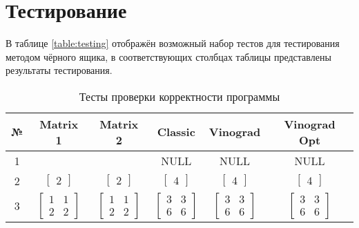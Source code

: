     \section{Тестирование}

        В таблице \ref{table:testing} отображён возможный набор тестов
        для тестирования методом чёрного ящика, в соответствующих столбцах таблицы представлены результаты тестирования.
        \begin{table}[h!]
            \caption{Тесты проверки корректности программы}
            \centering
            \begin{tabular}{|c|c|c|c|c|c|}
            \hline
            № & Matrix 1 & Matrix 2& Classic & Vinograd & Vinograd Opt \\\hline
            1 & \text{ } & \text{ } & NULL & NULL & NULL \\ \hline
            2 & $\begin{bmatrix} 2 \end{bmatrix}$ & $\begin{bmatrix} 2 \end{bmatrix}$ & $\begin{bmatrix} 4 \end{bmatrix}$ & $\begin{bmatrix} 4 \end{bmatrix}$ & $\begin{bmatrix} 4 \end{bmatrix}$\\ \hline
            3 & $\begin{bmatrix} 1 & 1 \\ 2 & 2 \end{bmatrix}$ & $\begin{bmatrix} 1 & 1 \\ 2 & 2 \end{bmatrix}$ & $\begin{bmatrix} 3 & 3 \\ 6 & 6\end{bmatrix}$ & $\begin{bmatrix} 3 & 3 \\ 6 & 6 \end{bmatrix}$ & $\begin{bmatrix} 3 & 3 \\ 6 & 6 \end{bmatrix}$\\ \hline

\end{tabular}
\end{table}
